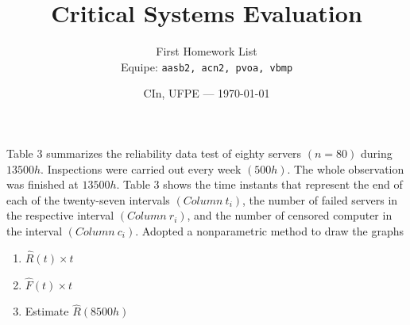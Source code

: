 \documentclass{article}
\title{Critical Systems Evaluation} %
\author{First Homework List\\ Equipe: \texttt{aasb2, acn2, pvoa, vbmp}} %
\date{CIn, UFPE --- \today} %
\begin{document}
\maketitle %

\setcounter{Question}{4}
\begin{question}
    Table 3 summarizes the reliability data test of eighty servers $(n = 80)$ during $13500h$. Inspections were carried out every week $(500h)$. The whole observation was finished at $13500h$. Table 3 shows the time instants that represent the end of each of the twenty-seven intervals $(Column \ t_i)$, the number of failed servers in the respective interval $(Column \ r_i)$, and the number of censored computer in the interval $(Column \ c_i)$. Adopted a nonparametric method to draw the graphs
    \begin{enumerate}[label=(\alph*)]
        \item $\hat{R}(t) \times t$
        \item $\hat{F}(t) \times t$
        \item Estimate $\hat{R}(8500h)$
    \end{enumerate}
\end{question}
\end{document}
